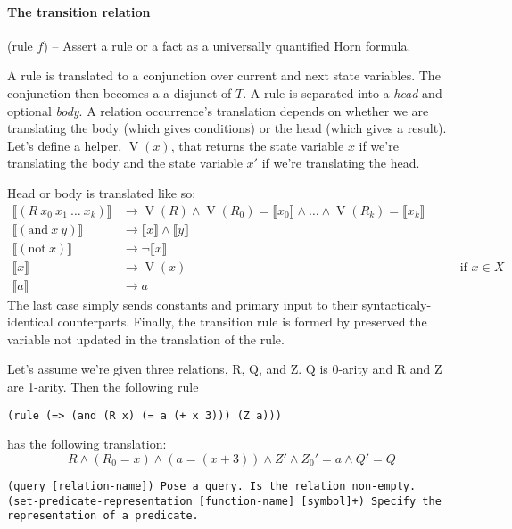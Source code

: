 \documentclass{article}
\newcommand{\Xlate}[1]{\llbracket #1 \rrbracket}
\DeclareMathOperator{\VarVersion}{V}
\begin{document}
\paragraph{The transition relation}

\begin{center}
(rule $f$) -- Assert a rule or a fact as a universally quantified Horn formula.
\end{center}

A rule is translated to a conjunction over current and next state variables.
The
conjunction then becomes a a disjunct of $T$. A rule is separated into
a \emph{head} and optional \emph{body}. A relation occurrence's
translation depends on whether we are translating the body (which gives
conditions) or the head (which gives a result).
Let's define a helper, $\VarVersion(x)$, that returns the state variable $x$ if we're translating the body and the state variable $x'$ if we're translating the head.

Head or body is translated like so:
\begin{align}
  \Xlate{(R~x_0~x_1~\ldots~x_k)} &\rightarrow  \VarVersion(R) \wedge \VarVersion(R_0)=\Xlate{x_0} \wedge \ldots \wedge \VarVersion(R_k)=\Xlate{x_k} & \\
  \Xlate{(\text{and}~x~y)} &\rightarrow \Xlate{x} \wedge \Xlate{y} & \\
  \Xlate{(\text{not}~x)} &\rightarrow \neg\Xlate{x} & \\
  \Xlate{x} &\rightarrow \VarVersion(x) & \qquad{} \text{if $x \in X$} \\
  \Xlate{a} &\rightarrow a & 
\end{align}
The last case simply sends constants and primary input to their syntacticaly-identical counterparts.
Finally, the transition rule is formed by preserved the variable not updated in the translation of the rule.

Let's assume we're given three relations, R, Q, and Z.
Q is 0-arity and R and Z are 1-arity.
Then the following rule
\begin{center}
  \texttt{(rule (=> (and (R x) (= a (+ x 3))) (Z a)))}
\end{center}
has the following translation:
\begin{equation}
  R \wedge (R_0 = x) \wedge  (a = (x+3)) \wedge Z' \wedge Z_0'=a \wedge Q' = Q
\end{equation}

\begin{verbatim}
(query [relation-name]) Pose a query. Is the relation non-empty.
(set-predicate-representation [function-name] [symbol]+) Specify the representation of a predicate.
\end{verbatim}
 
\end{document}
